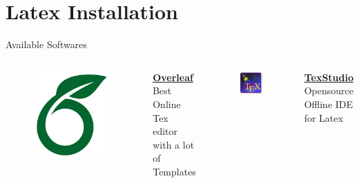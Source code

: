 \documentclass{beamer}
\begin{document}
\section{Latex Installation}
\begin{frame}{Available Softwares}
	\begin{columns}
		\begin{figure}
			\centering
			\includegraphics[width=0.5\linewidth]{overleaf.jpg}
		\end{figure}
		\centering
		\href{https://www.overleaf.com}{\textbf{Overleaf}}\\
		Best Online Tex editor with a lot of Templates
		\begin{figure}
			\centering
			\includegraphics[width=0.5\linewidth]{texstudio.jpg}
		\end{figure}
		\centering
		\href{https://www.texstudio.org}{\textbf{TexStudio}}\\
		Opensource Offline IDE for Latex
	\end{columns}
\end{frame}
\end{document}
